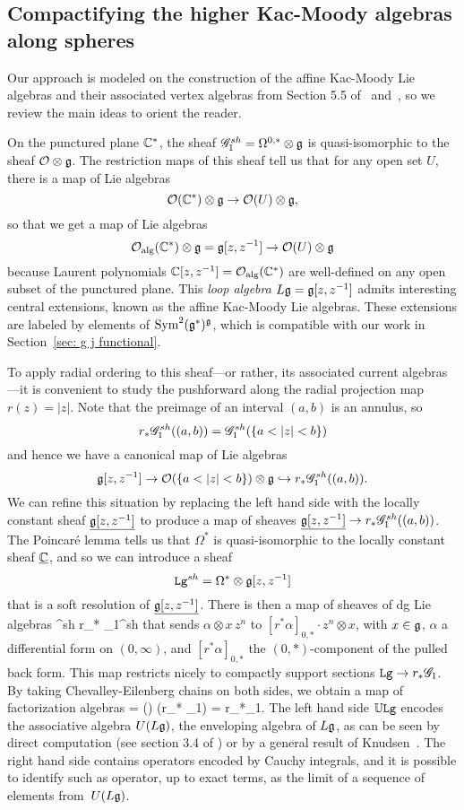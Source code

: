 \subsection{Compactifying the higher Kac-Moody algebras along spheres}

Our approach is modeled on the construction of the affine Kac-Moody Lie algebras and their associated vertex algebras from Section 5.5 of~\cite{CG1} and~\cite{OGthesis},
so we review the main ideas to orient the reader.

On the punctured plane $\mathbb C^*$, the sheaf $
\mathscr G_1^{sh} = \Omega^{0,*} \otimes \mathfrak g$ is quasi-isomorphic to the sheaf $\mathcal O \otimes \mathfrak g$.
The restriction maps of this sheaf tell us that for any open set $U$, there is a map of Lie algebras
\[
\mathcal O(\mathbb C^*) \otimes \mathfrak g \to \mathcal O(U) \otimes \mathfrak g,
\]
so that we get a map of Lie algebras
\[
\mathcal O_{\rm alg}(\mathbb C^*) \otimes \mathfrak g = \mathfrak g[z,z^{-1}] \to  \mathcal O(U) \otimes \mathfrak g
\]
because Laurent polynomials $\mathbb C[z,z^{-1}] = \mathcal O_{\rm alg}(\mathbb C^*)$ are well-defined on any open subset of the punctured plane.
This {\em loop algebra} $L\mathfrak g = \mathfrak g[z,z^{-1}]$ admits interesting central extensions,
known as the affine Kac-Moody Lie algebras.
These extensions are labeled by elements of ${\rm Sym}^2(\mathfrak g^*)^\mathfrak g$, 
which is compatible with our work in Section~\ref{sec: g j functional}.

To apply radial ordering to this sheaf---or rather, its associated current algebras---it is convenient to study the pushforward along the radial projection map $r(z) = |z|$.
Note that the preimage of an interval $(a,b)$ is an annulus, so
\[
r_* \mathscr G_1^{sh}((a,b)) = \mathscr G_1^{sh}(\{a < |z| < b\})
\]
and hence we have a canonical map of Lie algebras
\[
\mathfrak g[z,z^{-1}] \to \mathcal O(\{a < |z| < b\}) \otimes \mathfrak g \hookrightarrow r_* \mathscr G_1^{sh}((a,b)).
\]
We can refine this situation by replacing the left hand side with the locally constant sheaf $\underline{\mathfrak g[z,z^{-1}]}$ to produce a map of sheaves $\underline{\mathfrak g[z,z^{-1}]} \to  r_* \mathscr G_1^{sh}((a,b))$.
The Poincar\'e lemma tells us that $\Omega^*$ is quasi-isomorphic to the locally constant sheaf $\underline{\mathbb C}$,
and so we can introduce a sheaf
\[
\mathtt{Lg}^{sh} = \Omega^* \otimes \mathfrak g[z,z^{-1}]
\]
that is a soft resolution of $\underline{\mathfrak g[z,z^{-1}]}$.
There is then a map of sheaves of dg Lie algebras
\beqn
\label{eqn:looptolinearcurrent}
^{sh} \to r_* \sG_1^{sh}
\eeqn
that sends $\alpha \otimes x\, z^n$ to $[r^*\alpha]_{0,*} \cdot z^n \otimes x$, with $x \in \mathfrak g$, $\alpha$ a differential form on $(0,\infty)$, and $[r^*\alpha]_{0,*}$ the $(0,*)$-component of the pulled back form.
This map restricts nicely to compactly support sections $\mathtt{Lg} \to r_* \mathscr G_1$.
By taking Chevalley-Eilenberg chains on both sides, we obtain a map of factorization algebras
\beqn
\label{eqn:Uoflooptolinearcurrent}
\UU{} = \cliels() \to \cliels(r_* \sG_1) = r_*\UU\sG_1.
\eeqn
The left hand side $\mathbb U\mathtt{Lg}$ encodes the associative algebra $U(L\mathfrak g)$, the enveloping algebra of $L\mathfrak g$,
as can be seen by direct computation (see section 3.4 of \cite{CG1}) or by a general result of Knudsen~\cite{Knudsen}.
The right hand side contains operators encoded by Cauchy integrals, 
and it is possible to identify such as operator, up to exact terms, as the limit of a sequence of elements from~$U(L\mathfrak g)$.

